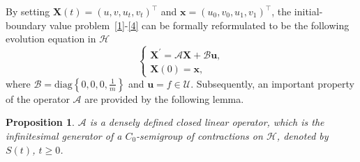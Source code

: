 \documentclass[10pt]{elsarticle}
\newtheorem{proposition}{Proposition}
\begin{document}
By setting $\mathbf{X}(t)=\left(u, v, u_t, v_t\right)^\top$ and $\mathbf{x} = (u_0, v_0, u_1, v_1)^\top$, the initial-boundary value problem~\eqref{1}-\eqref{4} can be formally reformulated to be the following evolution equation in $\mathcal{H}$
\begin{equation} \label{evolution}
\left
    \{
        \begin{array}{ll}
            \mathbf{X}^{\prime}=\mathcal{A}\mathbf{X} + \mathcal{B}\mathbf{ u},\\
            \mathbf{X}(0)=\mathbf{x},    
        \end{array}
\right.
\end{equation}
where $\mathcal{B} = \mathrm{diag}\left\{0, 0, 0, \frac{1}{m} \right\}$ and $\mathbf{ u} = f\in \mathcal{U}$.
Subsequently, an important property of the operator $\mathcal{A}$ are provided by the following lemma.
\begin{proposition}\label{prop:operator}
$\mathcal{A}$ is a densely defined closed linear operator, which is the infinitesimal generator of a $C_0$-semigroup of contractions on $\mathcal{H}$, denoted by ${S}(t)$, $t\geqslant 0$.
\end{proposition}
\end{document}
